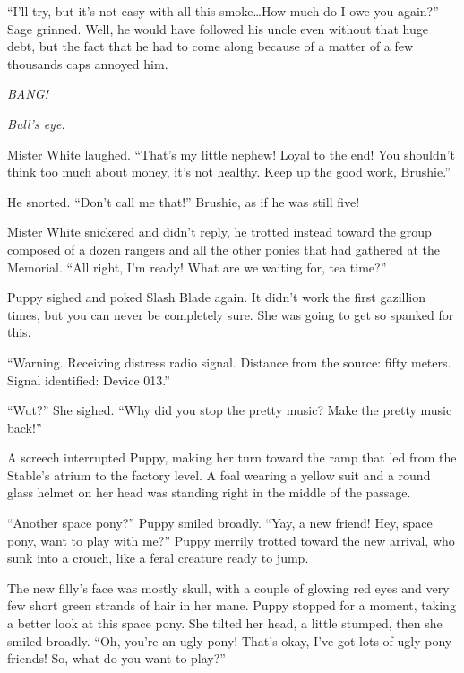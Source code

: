 ``I'll try, but it's not easy with all this smoke\dots How much do I owe you again?'' Sage grinned. Well, he would have followed his uncle even without that huge debt, but the fact that he had to come along because of a matter of a few thousands caps annoyed him.

\emph{BANG! }

\emph{Bull's eye.}

Mister White laughed. ``That's my little nephew! Loyal to the end! You shouldn't think too much about money, it's not healthy. Keep up the good work, Brushie.''

He snorted. ``Don't call me that!'' Brushie, as if he was still five!

Mister White snickered and didn't reply, he trotted instead toward the group composed of a dozen rangers and all the other ponies that had gathered at the Memorial. ``All right, I'm ready! What are we waiting for, tea time?''



\horizonline


Puppy sighed and poked Slash Blade again. It didn't work the first gazillion times, but you can never be completely sure. She was going to get so spanked for this.

{\mt ``Warning. Receiving distress radio signal. Distance from the source: fifty meters. Signal identified: Device 013.''}

``Wut?'' She sighed. ``Why did you stop the pretty music? Make the pretty music back!''

A screech interrupted Puppy, making her turn toward the ramp that led from the Stable's atrium to the factory level. A foal wearing a yellow suit and a round glass helmet on her head was standing right in the middle of the passage.

``Another space pony?'' Puppy smiled broadly. ``Yay, a new friend! Hey, space pony, want to play with me?'' Puppy merrily trotted toward the new arrival, who sunk into a crouch, like a feral creature ready to jump.

The new filly's face was mostly skull, with a couple of glowing red eyes and very few short green strands of hair in her mane. Puppy stopped for a moment, taking a better look at this space pony. She tilted her head, a little stumped, then she smiled broadly. ``Oh, you're an ugly pony! That's okay, I've got lots of ugly pony friends! So, what do you want to play?''

